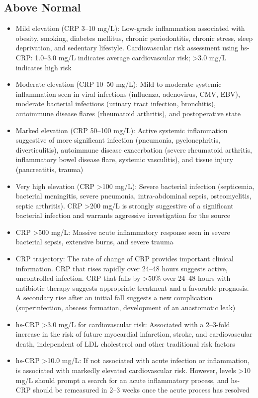 \subsection*{Above Normal}
\begin{itemize}
  \item Mild elevation (CRP 3--10 mg/L): Low-grade inflammation associated with obesity, smoking, diabetes mellitus, chronic periodontitis, chronic stress, sleep deprivation, and sedentary lifestyle. Cardiovascular risk assessment using hs-CRP: 1.0--3.0 mg/L indicates average cardiovascular risk; >3.0 mg/L indicates high risk
  \item Moderate elevation (CRP 10--50 mg/L): Mild to moderate systemic inflammation seen in viral infections (influenza, adenovirus, CMV, EBV), moderate bacterial infections (urinary tract infection, bronchitis), autoimmune disease flares (rheumatoid arthritis), and postoperative state
  \item Marked elevation (CRP 50--100 mg/L): Active systemic inflammation suggestive of more significant infection (pneumonia, pyelonephritis, diverticulitis), autoimmune disease exacerbation (severe rheumatoid arthritis, inflammatory bowel disease flare, systemic vasculitis), and tissue injury (pancreatitis, trauma)
  \item Very high elevation (CRP >100 mg/L): Severe bacterial infection (septicemia, bacterial meningitis, severe pneumonia, intra-abdominal sepsis, osteomyelitis, septic arthritis). CRP >200 mg/L is strongly suggestive of a significant bacterial infection and warrants aggressive investigation for the source
  \item CRP >500 mg/L: Massive acute inflammatory response seen in severe bacterial sepsis, extensive burns, and severe trauma
  \item CRP trajectory: The rate of change of CRP provides important clinical information. CRP that rises rapidly over 24--48 hours suggests active, uncontrolled infection. CRP that falls by >50\% over 24--48 hours with antibiotic therapy suggests appropriate treatment and a favorable prognosis. A secondary rise after an initial fall suggests a new complication (superinfection, abscess formation, development of an anastomotic leak)
  \item hs-CRP >3.0 mg/L for cardiovascular risk: Associated with a 2--3-fold increase in the risk of future myocardial infarction, stroke, and cardiovascular death, independent of LDL cholesterol and other traditional risk factors
  \item hs-CRP >10.0 mg/L: If not associated with acute infection or inflammation, is associated with markedly elevated cardiovascular risk. However, levels >10 mg/L should prompt a search for an acute inflammatory process, and hs-CRP should be remeasured in 2--3 weeks once the acute process has resolved
\end{itemize}

